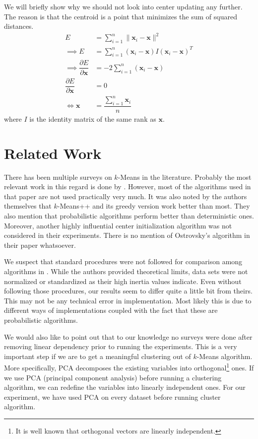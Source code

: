 \documentclass[twoside, 11pt]{article}
\newcommand{\x}{\mathbf{x}}
\begin{document}
	We will briefly show why we should not look into center updating any further. The reason is that the centroid is a point that minimizes the sum of squared distances.
		\begin{align*}
			E & = \sum_{i=1}^n\|\x_i-\x\|^2\\
			\implies E & = \sum_{i=1}^n(\x_i-\x)I(\x_i-\x)^{T}\\
			\implies \dfrac{\partial{E}}{\partial{\x}} & = -2\sum_{i=1}^n(\x_i-\x)\\
			\dfrac{\partial{E}}{\partial{\x}} & = 0\\
			\iff \x & = \dfrac{\sum_{i=1}^n\x_i}{n}
		\end{align*}
	where $I$ is the identity matrix of the same rank as $\x$.
	\section{Related Work}
	There has been multiple surveys on $k$-Means in the literature. Probably the most relevant work in this regard is done by \cite{celebi}. However, most of the algorithms used in that paper are not used practically very much. It was also noted by the authors themselves that $k$-Means++ and its greedy version work better than most. They also mention that probabilistic algorithms perform better than deterministic ones. Moreover, another highly influential center initialization algorithm \citep{ostrovsky} was not considered in their experiments. There is no mention of Ostrovsky's algorithm in their paper whatsoever.
	
	We suspect that standard procedures were not followed for comparison among algorithms in \cite{kmeans++}. While the authors provided theoretical limits, data sets were not normalized or standardized as their high inertia values indicate. Even without following those procedures, our results seem to differ quite a little bit from theirs. This may not be any technical error in implementation. Most likely this is due to different ways of implementations coupled with the fact that these are probabilistic algorithms.
	
	We would also like to point out that to our knowledge no surveys were done after removing linear dependency prior to running the experiments. This is a very important step if we are to get a meaningful clustering out of $k$-Means algorithm. More specifically, PCA decomposes the existing variables into orthogonal\footnote{It is well known that orthogonal vectors are linearly independent.} ones. If we use PCA (principal component analysis) before running a clustering algorithm, we can redefine the variables into linearly independent ones. For our experiment, we have used PCA on every dataset before running cluster algorithm.
	
\end{document}
